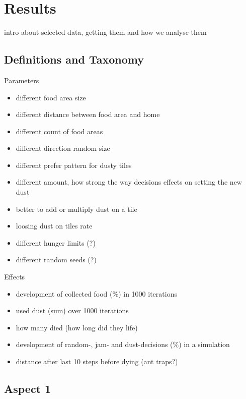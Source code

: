 \section{Results}\label{results}

intro about selected data, getting them and how we analyse them

\subsection{Definitions and Taxonomy}\label{definitions-and-taxonomy}

Parameters

\begin{itemize}
\tightlist
\item
  different food area size
\item
  different distance between food area and home
\item
  different count of food areas
\item
  different direction random size
\item
  different prefer pattern for dusty tiles
\item
  different amount, how strong the way decisions effects on setting the
  new dust
\item
  better to add or multiply dust on a tile
\item
  loosing dust on tiles rate
\item
  different hunger limits (?)
\item
  different random seeds (?)
\end{itemize}

Effects

\begin{itemize}
\tightlist
\item
  development of collected food (\%) in 1000 iterations
\item
  used dust (sum) over 1000 iterations
\item
  how many died (how long did they life)
\item
  development of random-, jam- and dust-decisions (\%) in a simulation
\item
  distance after last 10 steps before dying (ant traps?)
\end{itemize}

\subsection{Aspect 1}\label{aspect-1}

